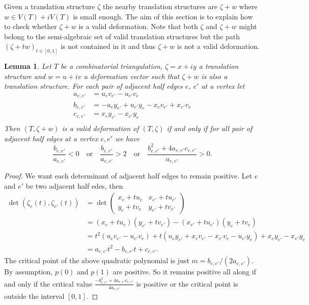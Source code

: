 \documentclass[a4paper,12pt]{article}
\newtheorem{lemma}[definition]{Lemma}
\begin{document}
Given a translation structure $\zeta$ the nearby translation structures are $\zeta + w$
where $w \in V(T) + i V(T)$ is small enough. The aim of this section is to
explain how to check whether $\zeta + w$ is a valid deformation. Note
that both $\zeta$ and $\zeta + w$ might belong to the semi-algebraic set of valid
translation structures but the path $(\zeta + t w)_{t \in [0,1]}$ is not contained
in it and thus $\zeta + w$ is not a valid deformation.
\begin{lemma}
Let $T$ be a combinatorial triangulation, $\zeta = x + i y$ a
translation structure and $w = u + i v$ a deformation vector such
that $\zeta + w$ is also a translation structure. For each
pair of adjacent half edges $e$, $e'$ at a vertex let
\begin{align*}
a_{e,e'} &= u_e v_{e'} - u_{e'} v_e \\
b_{e,e'} &= -u_e y_{e'} + u_{e'} y_e - x_e v_{e'} + x_{e'} v_e \\
c_{e,e'} &= x_e y_{e'} - x_{e'} y_e \\
\end{align*}
Then $(T, \zeta + w)$ is a valid deformation of $(T, \zeta)$ if and only if for all pair of adjacent half edges at a vertex $e,e'$ we have
\[
\frac{b_{e,e'}}{a_{e,e'}} < 0
\quad \text{or} \quad
\frac{b_{e,e'}}{a_{e,e'}} > 2
\quad \text{or} \quad
\frac{b_{e,e'}^2 + 4 a_{e,e'} c_{e,e'}}{a_{e,e'}} > 0.
\]
\end{lemma}

\begin{proof}
We want each determinant of adjacent half edges to remain positive. Let
$e$ and $e'$ be two adjacent half edes, then
\begin{align*}
\det(\zeta_{e}(t), \zeta_{e'}(t))
&= \det
\begin{pmatrix}
x_e + t u_e & x_{e'} + t u_{e'} \\
y_e + t v_e & y_{e'} + t v_{e'}
\end{pmatrix}
\\
&=  (x_e + t u_e)(y_{e'} + t v_{e'}) - (x_{e'} + t u_{e'})( y_e + t v_e) \\
&= t^2 (u_e v_{e'} - u_{e'} v_e) + t (u_e y_{e'} + x_e v_{e'} - x_{e'} v_e - u_{e'} y_e)
+ x_e y_{e'} - x_{e'} y_e \\
&= a_{e,e'}t^2 - b_{e,e'}t + c_{e,e'}.
\end{align*}
The critical point of the above quadratic polynomial is just $m = b_{e,e'} / (2 a_{e,e'})$.
By assumption, $p(0)$ and $p(1)$ are positive. So it remains positive all along if and
only if the critical value $\frac{-b_{e,e'}^2 + 4a_{e,e'}c_{e,e'}}{4 a_{e,e'}}$ is
positive or the critical point is outside the interval $[0,1]$.
\end{proof}
\end{document}
